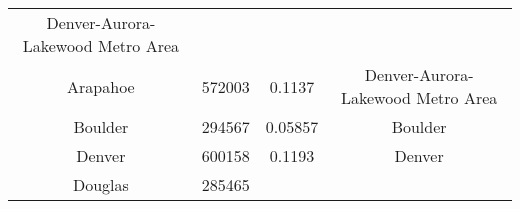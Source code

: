 \documentclass[12pt,twoside]{reedthesis}
\begin{document}
\begin{longtable}[]{@{}cccc@{}}
\begin{minipage}[t]{0.34\columnwidth}
  Denver-Aurora-Lakewood Metro Area\strut
  \end{minipage}\tabularnewline
  \begin{minipage}[t]{0.13\columnwidth}\centering\strut
  Arapahoe\strut
  \end{minipage} & \begin{minipage}[t]{0.21\columnwidth}\centering\strut
  572003\strut
  \end{minipage} & \begin{minipage}[t]{0.20\columnwidth}\centering\strut
  0.1137\strut
  \end{minipage} & \begin{minipage}[t]{0.34\columnwidth}\centering\strut
  Denver-Aurora-Lakewood Metro Area\strut
  \end{minipage}\tabularnewline
  \begin{minipage}[t]{0.13\columnwidth}\centering\strut
  Boulder\strut
  \end{minipage} & \begin{minipage}[t]{0.21\columnwidth}\centering\strut
  294567\strut
  \end{minipage} & \begin{minipage}[t]{0.20\columnwidth}\centering\strut
  0.05857\strut
  \end{minipage} & \begin{minipage}[t]{0.34\columnwidth}\centering\strut
  Boulder\strut
  \end{minipage}\tabularnewline
  \begin{minipage}[t]{0.13\columnwidth}\centering\strut
  Denver\strut
  \end{minipage} & \begin{minipage}[t]{0.21\columnwidth}\centering\strut
  600158\strut
  \end{minipage} & \begin{minipage}[t]{0.20\columnwidth}\centering\strut
  0.1193\strut
  \end{minipage} & \begin{minipage}[t]{0.34\columnwidth}\centering\strut
  Denver\strut
  \end{minipage}\tabularnewline
  \begin{minipage}[t]{0.13\columnwidth}\centering\strut
  Douglas\strut
  \end{minipage} & \begin{minipage}[t]{0.21\columnwidth}\centering\strut
  285465\strut
  \end{minipage} & \begin{minipage}[t]{0.20\columnwidth}\centering\strut

\end{minipage}
\end{longtable}
\end{document}
